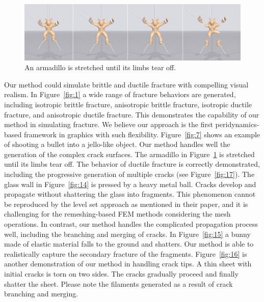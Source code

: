 \begin{figure}[t]
  \centering
  \includegraphics[width=\linewidth]{../figs/demo_tear_armadillo.png}
  \caption{\label{fig:13}
  An armadillo is stretched until its limbs tear off.
}
\end{figure}
 Our method could simulate brittle and ductile fracture with compelling visual realism. In Figure~\ref{fig:1} a wide range of fracture behaviors are generated, including isotropic brittle fracture, anisotropic brittle fracture, isotropic ductile fracture, and anisotropic ductile fracture. This demonstrates the capability of our method in simulating fracture. We believe our approach is the first peridynamics-based framework in graphics with such flexibility. Figure~\ref{fig:7} shows an example of shooting a bullet into a jello-like object. Our method handles well the generation of the complex crack surfaces. The armadillo in Figure~\ref{fig:13} is stretched until its limbs tear off. The behavior of ductile fracture is correctly demonstrated, including the progressive generation of multiple cracks (see Figure~\ref{fig:17}). The glass wall in Figure~\ref{fig:14} is pressed by a heavy metal ball. Cracks develop and propagate without shattering the glass into fragments. This phenomenon cannot be reproduced by the level set approach \cite{Hegemann:2013:LSM:2485895.2485908} as mentioned in their paper, and it is challenging for the remeshing-based FEM methods \cite{O'Brien:1999:GMA:311535.311550,O'Brien:2002:GMA:566654.566579} considering the mesh operations. In contrast, our method handles the complicated propagation process well, including the branching and merging of cracks. In Figure~\ref{fig:15} a bunny made of elastic material falls to the ground and shatters. Our method is able to realistically capture the secondary fracture of the fragments. Figure~\ref{fig:16} is another demonstration of our method in handling crack tips. A thin sheet with initial cracks is torn on two sides. The cracks gradually proceed and finally shatter the sheet. Please note the filaments generated as a result of crack branching and merging.

